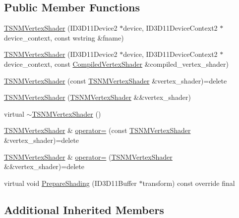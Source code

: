 \subsection*{Public Member Functions}
\begin{DoxyCompactItemize}
\item 
\hyperlink{classmage_1_1_t_s_n_m_vertex_shader_a08778a7323099f0002a639e95dde5ad3}{T\+S\+N\+M\+Vertex\+Shader} (I\+D3\+D11\+Device2 $\ast$device, I\+D3\+D11\+Device\+Context2 $\ast$device\+\_\+context, const wstring \&fname)
\item 
\hyperlink{classmage_1_1_t_s_n_m_vertex_shader_a378092b8cd15d352f67a3c9a0cb6801c}{T\+S\+N\+M\+Vertex\+Shader} (I\+D3\+D11\+Device2 $\ast$device, I\+D3\+D11\+Device\+Context2 $\ast$device\+\_\+context, const \hyperlink{structmage_1_1_compiled_vertex_shader}{Compiled\+Vertex\+Shader} \&compiled\+\_\+vertex\+\_\+shader)
\item 
\hyperlink{classmage_1_1_t_s_n_m_vertex_shader_abd4a1b3bb7dacdc2fc602491795008b1}{T\+S\+N\+M\+Vertex\+Shader} (const \hyperlink{classmage_1_1_t_s_n_m_vertex_shader}{T\+S\+N\+M\+Vertex\+Shader} \&vertex\+\_\+shader)=delete
\item 
\hyperlink{classmage_1_1_t_s_n_m_vertex_shader_a3c4a072e8a907437e4dfc15835253da5}{T\+S\+N\+M\+Vertex\+Shader} (\hyperlink{classmage_1_1_t_s_n_m_vertex_shader}{T\+S\+N\+M\+Vertex\+Shader} \&\&vertex\+\_\+shader)
\item 
virtual \hyperlink{classmage_1_1_t_s_n_m_vertex_shader_ac753a201fc0c12978811cca636da107e}{$\sim$\+T\+S\+N\+M\+Vertex\+Shader} ()
\item 
\hyperlink{classmage_1_1_t_s_n_m_vertex_shader}{T\+S\+N\+M\+Vertex\+Shader} \& \hyperlink{classmage_1_1_t_s_n_m_vertex_shader_ad3d444a889fcb9a736d0c0d2fba4ea88}{operator=} (const \hyperlink{classmage_1_1_t_s_n_m_vertex_shader}{T\+S\+N\+M\+Vertex\+Shader} \&vertex\+\_\+shader)=delete
\item 
\hyperlink{classmage_1_1_t_s_n_m_vertex_shader}{T\+S\+N\+M\+Vertex\+Shader} \& \hyperlink{classmage_1_1_t_s_n_m_vertex_shader_a84e30879d000172f309d7ec2f27c3ed1}{operator=} (\hyperlink{classmage_1_1_t_s_n_m_vertex_shader}{T\+S\+N\+M\+Vertex\+Shader} \&\&vertex\+\_\+shader)=delete
\item 
virtual void \hyperlink{classmage_1_1_t_s_n_m_vertex_shader_ad9ee77f591466d7843bcd413e3d7093d}{Prepare\+Shading} (I\+D3\+D11\+Buffer $\ast$transform) const override final
\end{DoxyCompactItemize}
\subsection*{Additional Inherited Members}


